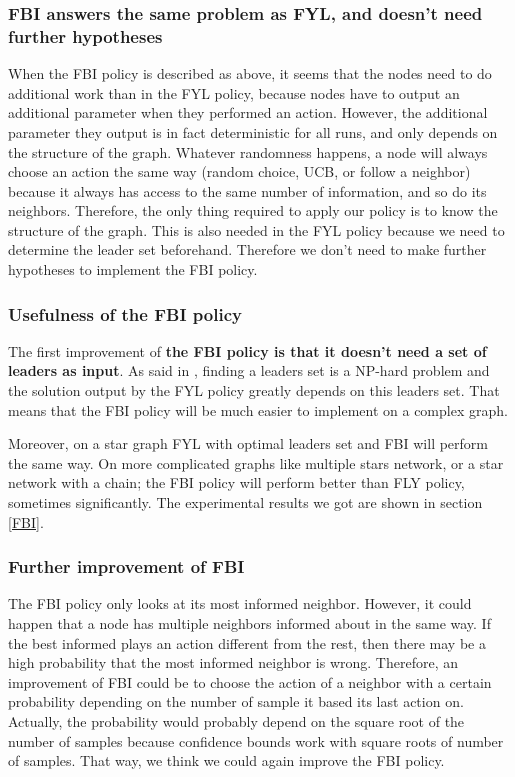 \documentclass{article}
\begin{document}
\subsubsection{FBI answers the same problem as FYL, and doesn't need further hypotheses}

When the FBI policy is described as above, it seems that the nodes need to do additional work than in the FYL policy, because nodes have to output an additional parameter when they performed an action. However, the additional parameter they output is in fact deterministic for all runs, and only depends on the structure of the graph. Whatever randomness happens, a node will always choose an action the same way (random choice, UCB, or follow a neighbor) because it always has access to the same number of information, and so do its neighbors. Therefore, the only thing required to apply our policy is to know the structure of the graph. This is also needed in the FYL policy because we need to determine the leader set beforehand. Therefore we don't need to make further hypotheses to implement the FBI policy.

\subsubsection{Usefulness of the FBI policy}

The first improvement of \textbf{the FBI policy is that it doesn't need a set of leaders as input}. As said in \cite{DBLP:journals/corr/KollaJG16}, finding a leaders set is a NP-hard problem and the solution output by the FYL policy greatly depends on this leaders set. That means that the FBI policy will be much easier to implement on a complex graph.

Moreover, on a star graph FYL with optimal leaders set and FBI will perform the same way. On more complicated graphs like multiple stars network, or a star network with a chain; the FBI policy will perform better than FLY policy, sometimes significantly. The experimental results we got are shown in section \ref{FBI}.

\subsubsection{Further improvement of FBI}

The FBI policy only looks at its most informed neighbor. However, it could happen that a node has multiple neighbors informed about in the same way. If the best informed plays an action different from the rest, then there may be a high probability that the most informed neighbor is wrong. Therefore, an improvement of FBI could be to choose the action of a neighbor with a certain probability depending on the number of sample it based its last action on. Actually, the probability would probably depend on the square root of the number of samples because confidence bounds work with square roots of number of samples. That way, we think we could again improve the FBI policy.
\end{document}
